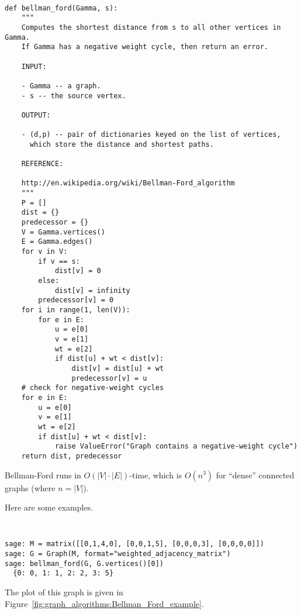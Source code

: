 \begin{center}
\fontsize{9pt}{9pt}
\selectfont
\tt
\begin{lstlisting}
def bellman_ford(Gamma, s):
    """
    Computes the shortest distance from s to all other vertices in Gamma.
    If Gamma has a negative weight cycle, then return an error.

    INPUT:

    - Gamma -- a graph.
    - s -- the source vertex.

    OUTPUT:

    - (d,p) -- pair of dictionaries keyed on the list of vertices,
      which store the distance and shortest paths.

    REFERENCE:

    http://en.wikipedia.org/wiki/Bellman-Ford_algorithm
    """
    P = []
    dist = {}
    predecessor = {}
    V = Gamma.vertices()
    E = Gamma.edges()
    for v in V:
        if v == s:
            dist[v] = 0
        else:
            dist[v] = infinity
        predecessor[v] = 0
    for i in range(1, len(V)):
        for e in E:
            u = e[0]
            v = e[1]
            wt = e[2]
            if dist[u] + wt < dist[v]:
                dist[v] = dist[u] + wt
                predecessor[v] = u
    # check for negative-weight cycles
    for e in E:
        u = e[0]
        v = e[1]
        wt = e[2]
        if dist[u] + wt < dist[v]:
            raise ValueError("Graph contains a negative-weight cycle")
    return dist, predecessor
\end{lstlisting}
\end{center}

Bellman-Ford runs in $O(|V|\cdot |E|)$-time, which is $O(n^3)$ for
``dense'' connected graphs (where $n=|V|$).

Here are some examples.

\begin{center}
\fontsize{9pt}{9pt}
\selectfont
\tt
\begin{lstlisting}
sage: M = matrix([[0,1,4,0], [0,0,1,5], [0,0,0,3], [0,0,0,0]])
sage: G = Graph(M, format="weighted_adjacency_matrix")
sage: bellman_ford(G, G.vertices()[0])
  {0: 0, 1: 1, 2: 2, 3: 5}
\end{lstlisting}
\end{center}
%
The plot of this graph is given in
Figure~\ref{fig:graph_algorithms:Bellman_Ford_example}.

